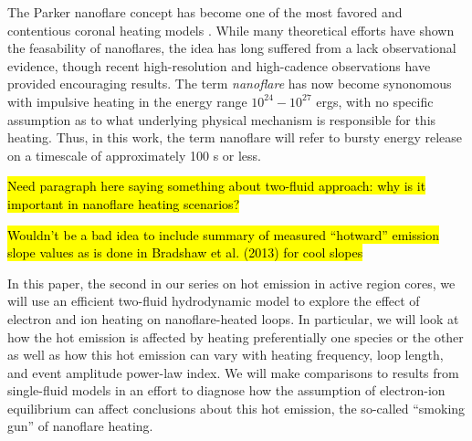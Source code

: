 \documentclass[iop]{emulateapj}
\begin{document}
	\par The Parker nanoflare concept has become one of the most favored and contentious coronal heating models \citep{cargill_implications_1994,cargill_nanoflare_2004,klimchuk_solving_2006}. While many theoretical efforts \citep[e.g.][]{bradshaw_diagnosing_2012,reep_diagnosing_2013} have shown the feasability of nanoflares, the idea has long suffered from a lack observational evidence, though recent high-resolution and high-cadence observations \citep{brosius_pervasive_2014,testa_observing_2013,testa_evidence_2014} have provided encouraging results. The term \textit{nanoflare} has now become synonomous with impulsive heating in the energy range $10^{24}-10^{27}$ ergs, with no specific assumption as to what underlying physical mechanism is responsible for this heating. Thus, in this work, the term nanoflare will refer to bursty energy release on a timescale of approximately 100 s or less.
	\par\hl{Need paragraph here saying something about two-fluid approach: why is it important in nanoflare heating scenarios?}
	\par\hl{Wouldn't be a bad idea to include summary of measured ``hotward'' emission slope values as is done in Bradshaw et al. (2013) for cool slopes}
	\par In this paper, the second in our series on hot emission in active region cores, we will use an efficient two-fluid hydrodynamic model to explore the effect of electron and ion heating on nanoflare-heated loops. In particular, we will look at how the hot emission is affected by heating preferentially one species or the other as well as how this hot emission can vary with heating frequency, loop length, and event amplitude power-law index. We will make comparisons to results from single-fluid models in an effort to diagnose how the assumption of electron-ion equilibrium can affect conclusions about this hot emission, the so-called ``smoking gun'' of nanoflare heating.
\end{document}
